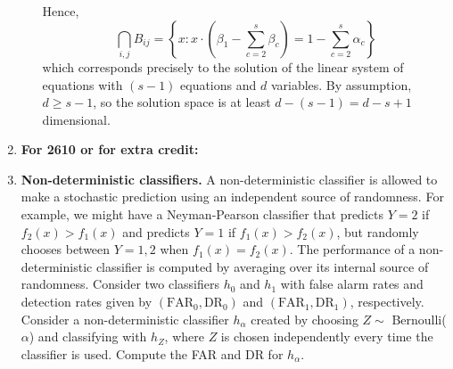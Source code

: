 \documentclass[11pt]{report}
\begin{document}
\begin{enumerate}[1.]
\begin{enumerate}[(a)]
		            Hence,
		            \[\bigcap_{i, j} B_{ij} = \left\{x: x \cdot \left(\beta_1 - \sum_{c = 2}^s \beta_c\right)  = 1 - \sum_{c=2}^{s} \alpha_c \right\}\]
		            which corresponds precisely to the solution of the linear system of equations with $(s - 1)$ equations and $d$ variables. By assumption, $d \geq s - 1$, so the solution space is at least $d - (s - 1) = d - s + 1$ dimensional.


		            \color{black}


	      \end{enumerate}


	      \pagebreak


	\item[] \hspace{-3ex} {\bf For 2610 or for extra credit:}






	\item {\bf Non-deterministic classifiers.} A non-deterministic classifier is allowed to make a stochastic prediction using an independent source of randomness. For example, we might have a Neyman-Pearson classifier that predicts $Y=2$ if $f_2(x)>f_1(x)$ and predicts $Y=1$ if $f_1(x)>f_2(x)$, but randomly chooses between $Y=1,2$ when $f_1(x)=f_2(x)$. The performance of a non-deterministic classifier is computed by averaging over its internal source of randomness. Consider two classifiers $h_0$ and $h_1$ with false alarm rates and detection rates given by $(\text{FAR}_0,\text{DR}_0)$ and $(\text{FAR}_1,\text{DR}_1)$, respectively. Consider a non-deterministic classifier $h_\alpha$ created by choosing $Z\sim $ Bernoulli($\alpha$) and classifying with $h_Z$, where $Z$ is chosen independently every time the classifier is used. Compute the FAR and DR for $h_\alpha$.


\end{enumerate}
\end{document}
